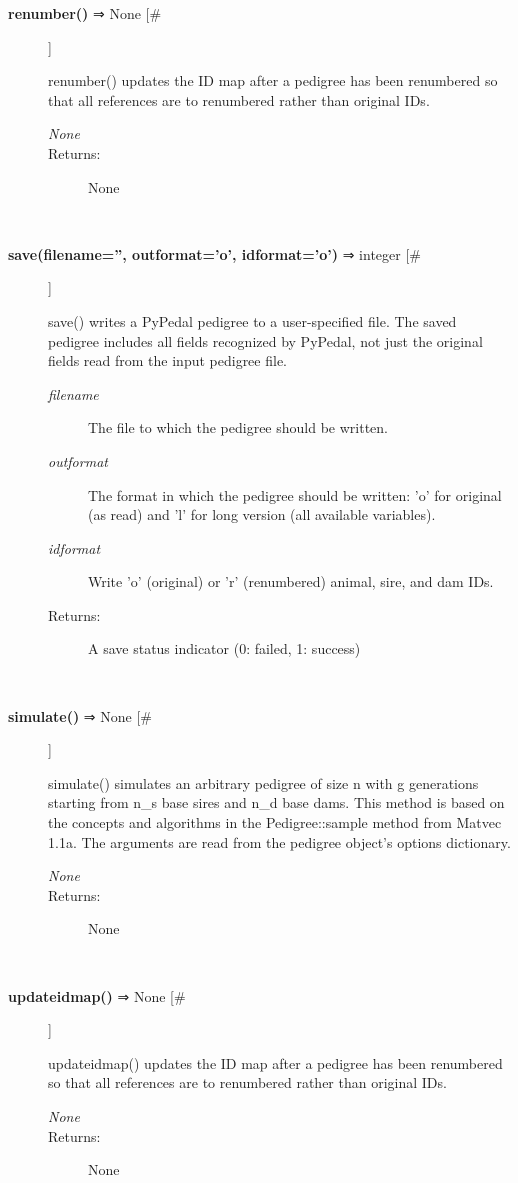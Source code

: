 \documentclass{article}
\begin{document}
\begin{description}
\item[\textbf{renumber()} ⇒ None [\#]
]
\par renumber() updates the ID map after a pedigree has been renumbered so that all references
are to renumbered rather than original IDs.
\begin{description}
\item[\textit{None}
]

\item[Returns:
]
None
\end{description}\\

\item[\textbf{save(filename='', outformat='o', idformat='o')} ⇒ integer [\#]
]
\par save() writes a PyPedal pedigree to a user-specified file.  The saved pedigree includes
all fields recognized by PyPedal, not just the original fields read from the input pedigree
file.
\begin{description}
\item[\textit{filename}
]
The file to which the pedigree should be written.
\item[\textit{outformat}
]
The format in which the pedigree should be written: 'o' for original (as read) and 'l' for long version (all available variables).
\item[\textit{idformat}
]
Write 'o' (original) or 'r' (renumbered) animal, sire, and dam IDs.
\item[Returns:
]
A save status indicator (0: failed, 1: success)
\end{description}\\

\item[\textbf{simulate()} ⇒ None [\#]
]
\par simulate() simulates an arbitrary pedigree of size n with g generations
starting from n\_s base sires and n\_d base dams.  This method is based on
the concepts and algorithms in the Pedigree::sample method from Matvec
1.1a.  The arguments are read from the pedigree object's options
dictionary.
\begin{description}
\item[\textit{None}
]

\item[Returns:
]
None
\end{description}\\

\item[\textbf{updateidmap()} ⇒ None [\#]
]
\par updateidmap() updates the ID map after a pedigree has been renumbered so that all references
are to renumbered rather than original IDs.
\begin{description}
\item[\textit{None}
]

\item[Returns:
]
None
\end{description}\\

\end{description}
\end{document}

